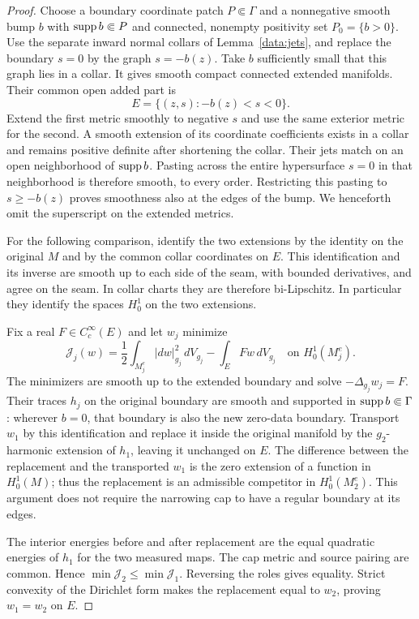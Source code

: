 \begin{proof}
Choose a boundary coordinate patch $P\Subset\Gamma$ and a
nonnegative smooth bump $b$ with $\operatorname{supp} b\Subset P$ and connected,
nonempty positivity set $P_0=\{b>0\}$. Use the separate inward
normal collars of Lemma~\ref{data:jets}, and replace the boundary
$s=0$ by the graph $s=-b(z)$. Take $b$ sufficiently small that this
graph lies in a collar. It gives smooth compact connected extended
manifolds. Their common open added part is
\[
 E=\{(z,s):-b(z)<s<0\}.
\]
Extend the first metric smoothly to negative $s$ and use the same
exterior metric for the second. A smooth extension of its coordinate
coefficients exists in a collar and remains positive definite after
shortening the collar. Their jets match on an open neighborhood of
$\operatorname{supp} b$. Pasting across the entire hypersurface $s=0$ in that
neighborhood is therefore smooth, to every order. Restricting this
pasting to $s\ge-b(z)$ proves smoothness also at the edges of the
bump. We henceforth omit the superscript on the extended metrics.

For the following comparison, identify the two extensions by the
identity on the original $M$ and by the common collar coordinates
on $E$. This identification and its inverse are smooth up to
each side of the seam, with bounded derivatives, and agree on the
seam. In collar charts they are therefore bi-Lipschitz. In particular
they identify the spaces $H^1_0$ on the two extensions.

Fix a real $F\in C_c^\infty(E)$ and let $w_j$ minimize
\[
 \mathcal J_j(w)=\frac12\int_{M_j^e}|dw|_{g_j}^2\,dV_{g_j}
                       -\int_E Fw\,dV_{g_j}
       \quad\text{on }H^1_0(M_j^e).
\]
The minimizers are smooth up to the extended boundary and solve
$-\Delta_{g_j}w_j=F$. Their traces $h_j$ on the original boundary
are smooth and supported in $\operatorname{supp} b\Subset\Gamma$: wherever
$b=0$, that boundary is also the new zero-data boundary.
Transport $w_1$ by this identification and replace it inside the
original manifold by the $g_2$-harmonic
extension of $h_1$, leaving it unchanged on $E$. The difference
between the replacement and the transported $w_1$ is the zero extension of a function
in $H^1_0(M)$; thus the replacement is an admissible competitor in
$H^1_0(M_2^e)$. This argument does not require the narrowing cap to
have a regular boundary at its edges.

The interior energies before and after replacement are the equal
quadratic energies of $h_1$ for the two measured maps. The cap metric
and source pairing are common. Hence
$\min\mathcal J_2\le\min\mathcal J_1$. Reversing the roles gives
equality. Strict convexity of the Dirichlet form makes the replacement
equal to $w_2$, proving $w_1=w_2$ on $E$.


\end{proof}
